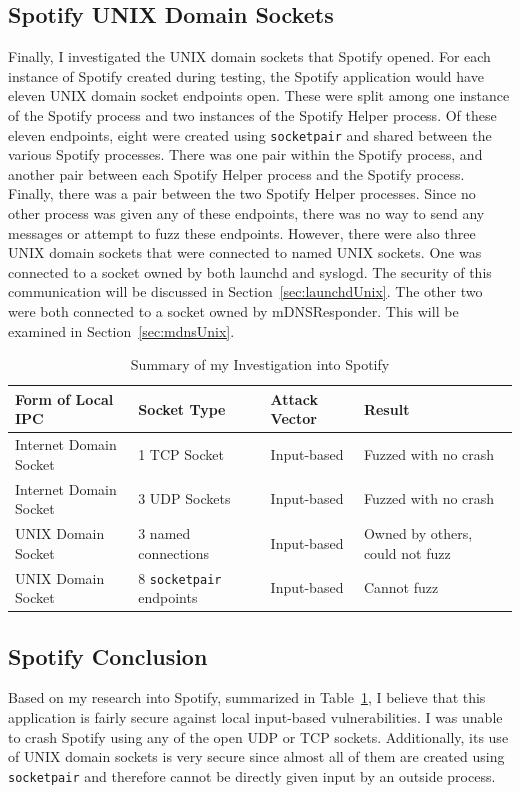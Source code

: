 \subsection{Spotify UNIX Domain Sockets}
\label{sec:spotifyUnix}
Finally, I investigated the UNIX domain sockets that Spotify opened.  For each instance of Spotify created during testing, the Spotify application would have eleven UNIX domain socket endpoints open.  These were split among one instance of the Spotify process and two instances of the Spotify Helper process.  Of these eleven endpoints, eight were created using \texttt{socketpair} and shared between the various Spotify processes.  There was one pair within the Spotify process, and another pair between each Spotify Helper process and the Spotify process.  Finally, there was a pair between the two Spotify Helper processes.  Since no other process was given any of these endpoints, there was no way to send any messages or attempt to fuzz these endpoints.  However, there were also three UNIX domain sockets that were connected to named UNIX sockets.  One was connected to a socket owned by both launchd and syslogd.  The security of this communication will be discussed in Section~\ref{sec:launchdUnix}.  The other two were both connected to a socket owned by mDNSResponder.  This will be examined in Section~\ref{sec:mdnsUnix}.

\begin{table}
\centering
\begin{scriptsize}
\begin{tabular}{ l | l | l | l }
\textbf{Form of Local IPC} & \textbf{Socket Type} & \textbf{Attack Vector} & \textbf{Result} \\ \hline
Internet Domain Socket & 1 TCP Socket & Input-based & Fuzzed with no crash \\ \hline
Internet Domain Socket & 3 UDP Sockets & Input-based & Fuzzed with no crash \\ \hline
UNIX Domain Socket & 3 named connections & Input-based & Owned by others, could not fuzz \\ \hline
UNIX Domain Socket & 8 \texttt{socketpair} endpoints & Input-based & Cannot fuzz \\ \hline
\end{tabular}
\caption{Summary of my Investigation into Spotify}
\label{tab:spotifyData}
\end{scriptsize}
\end{table} 

\subsection{Spotify Conclusion}
\label{sec:spotifyConclusion}
Based on my research into Spotify, summarized in Table~\ref{tab:spotifyData}, I believe that this application is fairly secure against local input-based vulnerabilities.  I was unable to crash Spotify using any of the open UDP or TCP sockets.  Additionally, its use of UNIX domain sockets is very secure since almost all of them are created using \texttt{socketpair} and therefore cannot be directly given input by an outside process.

